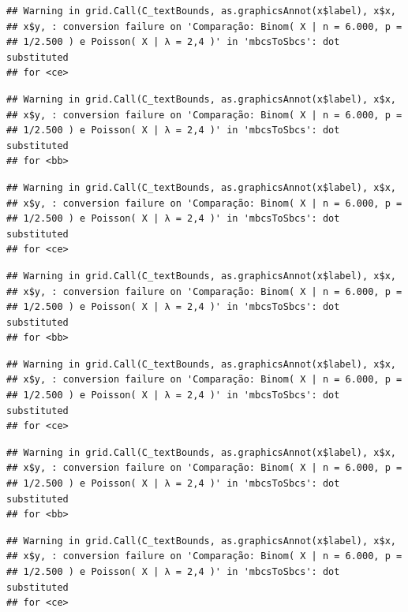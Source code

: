 \documentclass[
  11pt]{report}
\begin{document}
\begin{verbatim}
## Warning in grid.Call(C_textBounds, as.graphicsAnnot(x$label), x$x,
## x$y, : conversion failure on 'Comparação: Binom( X | n = 6.000, p =
## 1/2.500 ) e Poisson( X | λ = 2,4 )' in 'mbcsToSbcs': dot substituted
## for <ce>
\end{verbatim}

\begin{verbatim}
## Warning in grid.Call(C_textBounds, as.graphicsAnnot(x$label), x$x,
## x$y, : conversion failure on 'Comparação: Binom( X | n = 6.000, p =
## 1/2.500 ) e Poisson( X | λ = 2,4 )' in 'mbcsToSbcs': dot substituted
## for <bb>
\end{verbatim}

\begin{verbatim}
## Warning in grid.Call(C_textBounds, as.graphicsAnnot(x$label), x$x,
## x$y, : conversion failure on 'Comparação: Binom( X | n = 6.000, p =
## 1/2.500 ) e Poisson( X | λ = 2,4 )' in 'mbcsToSbcs': dot substituted
## for <ce>
\end{verbatim}

\begin{verbatim}
## Warning in grid.Call(C_textBounds, as.graphicsAnnot(x$label), x$x,
## x$y, : conversion failure on 'Comparação: Binom( X | n = 6.000, p =
## 1/2.500 ) e Poisson( X | λ = 2,4 )' in 'mbcsToSbcs': dot substituted
## for <bb>
\end{verbatim}

\begin{verbatim}
## Warning in grid.Call(C_textBounds, as.graphicsAnnot(x$label), x$x,
## x$y, : conversion failure on 'Comparação: Binom( X | n = 6.000, p =
## 1/2.500 ) e Poisson( X | λ = 2,4 )' in 'mbcsToSbcs': dot substituted
## for <ce>
\end{verbatim}

\begin{verbatim}
## Warning in grid.Call(C_textBounds, as.graphicsAnnot(x$label), x$x,
## x$y, : conversion failure on 'Comparação: Binom( X | n = 6.000, p =
## 1/2.500 ) e Poisson( X | λ = 2,4 )' in 'mbcsToSbcs': dot substituted
## for <bb>
\end{verbatim}

\begin{verbatim}
## Warning in grid.Call(C_textBounds, as.graphicsAnnot(x$label), x$x,
## x$y, : conversion failure on 'Comparação: Binom( X | n = 6.000, p =
## 1/2.500 ) e Poisson( X | λ = 2,4 )' in 'mbcsToSbcs': dot substituted
## for <ce>
\end{verbatim}
\end{document}

